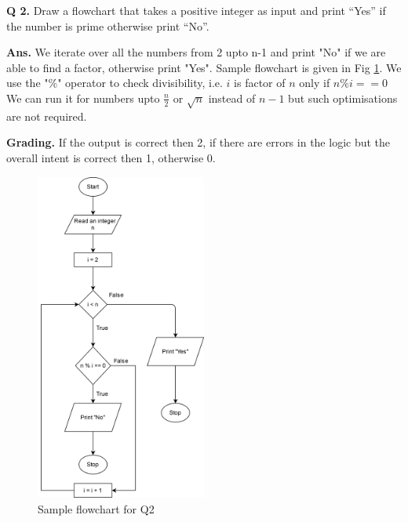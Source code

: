 \documentclass{article}
\begin{document}
\clearpage


\begin{flushleft}

    \textbf{Q 2. } Draw a flowchart that takes a positive integer as input and 
    print “Yes” if the number is prime otherwise print “No”.

    
    \end{flushleft}
    
    \begin{flushleft}
    
    \textbf{Ans. } We iterate over all the numbers from 2 upto n-1 and print
    "No" if we are able to find a factor, otherwise print "Yes". 
    Sample flowchart is given in Fig \ref{Q2}.
    We use the "\%" operator to check divisibility, i.e. $i$ is factor of $n$
    only if $n \% i == 0$
    We can run it for numbers upto $\frac{n}{2}$ or $\sqrt{n}$ instead of $n-1$
    but such optimisations are not required.
    
    \end{flushleft}
    
    \begin{flushleft}
    
    \textbf{Grading. } If the output is correct then 2, if there are errors in
    the logic but the overall intent is correct then 1, otherwise 0.
    
\end{flushleft}
    
    \begin{figure}[ht]
        \centering
        \includegraphics[width=0.5\textwidth]{Q2.png}
        \caption{Sample flowchart for Q2}
        \label{Q2}
    \end{figure}
    
\end{document}
